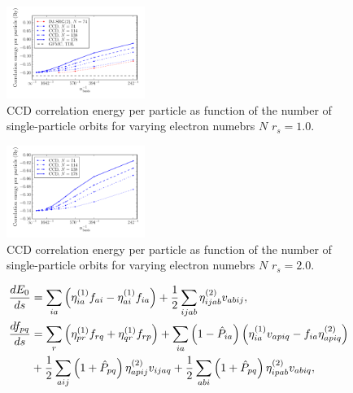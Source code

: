 \documentclass[aps,twocolumn,showpacs,floatfix,nofootinbib,preprintnumbers,superscriptaddress,amsmath,amssymb]{revtex4-1}
\begin{document}
\begin{figure}[hbtp]
     \begin{center}

            \includegraphics[width=0.4\textwidth]{figures/nOrbitsEneNRs10.pdf}
    \end{center}
    \caption{CCD correlation energy per particle as function of the number of
single-particle orbits for varying  electron numebrs $N$ $r_s=1.0$.}
            \label{fig:ccd05}
\end{figure}

\begin{figure}[hbtp]
     \begin{center}

            \includegraphics[width=0.4\textwidth]{figures/nOrbitsEneNRs20.pdf}
    \end{center}
    \caption{CCD correlation energy per particle as function of the number of
single-particle orbits for varying  electron numebrs $N$ $r_s=2.0$.}
            \label{fig:ccd05}
\end{figure}




\begin{align}
\frac{d E_0}{ds} &= \sum_{ia}\left( \eta_{ia}^{(1)}f_{ai} -
\eta_{ai}^{(1)}f_{ia}\right) +
\frac{1}{2}\sum_{ijab}\eta_{ijab}^{(2)}v_{abij},
\label{eq:flow1}\\
\frac{d f_{pq}}{ds}&= \sum_r \left( \eta_{pr}^{(1)}f_{rq} +
\eta_{qr}^{(1)}f_{rp}\right) + \sum_{ia}\left( 1-\hat{P}_{ia}\right)
\left( \eta_{ia}^{(1)}v_{apiq} - f_{ia}\eta_{apiq}^{(2)} \right)
\notag \\ & +\frac{1}{2} \sum_{aij} \left( 1+\hat{P}_{pq}\right)
\eta_{apij}^{(2)}v_{ijaq} + \frac{1}{2}\sum_{abi}\left(
1+\hat{P}_{pq}\right) \eta_{ipab}^{(2)}v_{abiq},
\label{eq:flow2}
\end{align}
\end{document}
